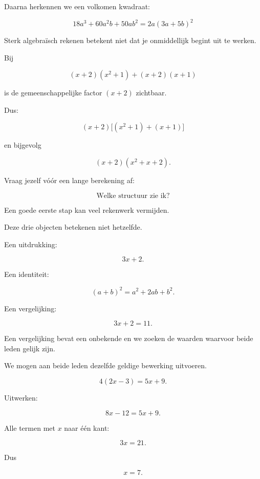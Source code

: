 \documentclass{ximera}
\begin{document}
Daarna herkennen we een volkomen kwadraat:

\[
\boxed{
18a^3+60a^2b+50ab^2
=
2a(3a+5b)^2
}
\]



Sterk algebraïsch rekenen betekent niet dat je onmiddellijk begint uit te werken.

Bij

\[
(x+2)(x^2+1)+(x+2)(x+1)
\]

is de gemeenschappelijke factor \((x+2)\) zichtbaar.

Dus:

\[
(x+2)\bigl[(x^2+1)+(x+1)\bigr]
\]

en bijgevolg

\[
(x+2)(x^2+x+2).
\]

\begin{opmerking}
Vraag jezelf vóór een lange berekening af:

\[
\boxed{\text{Welke structuur zie ik?}}
\]

Een goede eerste stap kan veel rekenwerk vermijden.
\end{opmerking}




Deze drie objecten betekenen niet hetzelfde.

Een uitdrukking:

\[
3x+2.
\]

Een identiteit:

\[
(a+b)^2=a^2+2ab+b^2.
\]

Een vergelijking:

\[
3x+2=11.
\]

Een vergelijking bevat een onbekende en we zoeken de waarden waarvoor beide leden gelijk zijn.



We mogen aan beide leden dezelfde geldige bewerking uitvoeren.

\begin{voorbeeld}
\[
4(2x-3)=5x+9.
\]

Uitwerken:

\[
8x-12=5x+9.
\]

Alle termen met \(x\) naar één kant:

\[
3x=21.
\]

Dus

\[
x=7.
\]
\end{voorbeeld}
\end{document}
